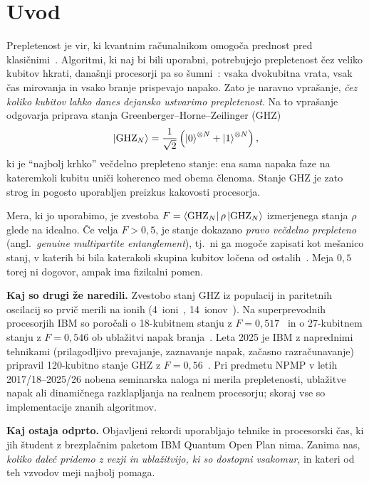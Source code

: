 \section{Uvod}
\label{g20:sec:uvod}

Prepletenost je vir, ki kvantnim računalnikom omogoča prednost pred klasičnimi~\cite{nielsen2010}. Algoritmi, ki naj bi bili
uporabni, potrebujejo prepletenost čez veliko kubitov hkrati, današnji procesorji pa so šumni~\cite{preskill2018}: vsaka
dvokubitna vrata, vsak čas mirovanja in vsako branje prispevajo napako. Zato je naravno vprašanje, \emph{čez koliko kubitov
lahko danes dejansko ustvarimo prepletenost}. Na to vprašanje odgovarja priprava stanja Greenberger--Horne--Zeilinger
(GHZ)~\cite{g20:greenberger1990}
\begin{equation}
\ket{\mathrm{GHZ}_N} = \frac{1}{\sqrt{2}}\left(\ket{0}^{\otimes N} + \ket{1}^{\otimes N}\right),
\label{g20:eq:ghz}
\end{equation}
ki je \enquote{najbolj krhko} večdelno prepleteno stanje: ena sama napaka faze na kateremkoli kubitu uniči koherenco med
obema členoma. Stanje GHZ je zato strog in pogosto uporabljen preizkus kakovosti procesorja.

Mera, ki jo uporabimo, je zvestoba $F=\bra{\mathrm{GHZ}_N}\rho\ket{\mathrm{GHZ}_N}$ izmerjenega stanja $\rho$ glede na
idealno. Če velja $F>0{,}5$, je stanje dokazano \emph{pravo večdelno prepleteno} (angl.\ \emph{genuine multipartite
entanglement}), tj.\ ni ga mogoče zapisati kot mešanico stanj, v katerih bi bila katerakoli skupina kubitov ločena od
ostalih~\cite{g20:guhne2009}. Meja $0{,}5$ torej ni dogovor, ampak ima fizikalni pomen.

\textbf{Kaj so drugi že naredili.} Zvestobo stanj GHZ iz populacij in paritetnih oscilacij so prvič merili na ionih
(4~ioni~\cite{g20:sackett2000}, 14~ionov~\cite{g20:monz2011}). Na superprevodnih procesorjih IBM so poročali o 18-kubitnem
stanju z $F=0{,}517$~\cite{g20:wei2020} in o 27-kubitnem stanju z $F=0{,}546$ ob ublažitvi napak branja~\cite{g20:mooney2021}.
Leta 2025 je IBM z naprednimi tehnikami (prilagodljivo prevajanje, zaznavanje napak, začasno razračunavanje) pripravil
120-kubitno stanje GHZ z $F=0{,}56$~\cite{g20:ibm2025bigcats}. Pri predmetu NPMP v letih 2017/18--2025/26 nobena
seminarska naloga ni merila prepletenosti, ublažitve napak ali dinamičnega razklapljanja na realnem procesorju; skoraj vse so
implementacije znanih algoritmov.

\textbf{Kaj ostaja odprto.} Objavljeni rekordi uporabljajo tehnike in procesorski čas, ki jih študent z brezplačnim
paketom IBM Quantum Open Plan nima. Zanima nas, \emph{koliko daleč pridemo z vezji in ublažitvijo, ki so dostopni vsakomur}, in
kateri od teh vzvodov meji najbolj pomaga.

